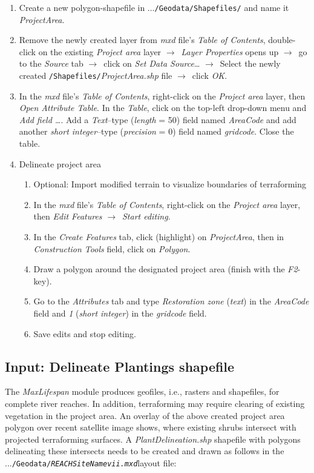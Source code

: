 \begin{enumerate}
\def\labelenumi{\arabic{enumi})}
\item Create a new polygon-shapefile in $\ldots{}$\texttt{/Geodata/Shapefiles/} and name it \emph{ProjectArea}.
\item Remove the newly created layer from \emph{mxd} file's \emph{Table of Contents}, double-click on the existing \emph{Project area} layer $\rightarrow$~\emph{Layer Properties} opens up $\rightarrow$~go to the \emph{Source} tab $\rightarrow$~click on \emph{Set Data Source}\ldots{} $\rightarrow$~Select the newly created \texttt{/Shapefiles/}\emph{ProjectArea.shp} file $\rightarrow$~click \emph{OK}.
\item In the \emph{mxd} file's \emph{Table of Contents}, right-click on the \emph{Project area} layer, then \emph{Open Attribute Table}. In the \emph{Table}, click on the top-left drop-down menu and \emph{Add field \ldots{}}. Add a \emph{Text}--type (\emph{length} = 50) field named \emph{AreaCode} and add another \emph{short integer}--type (\emph{precision} = 0) field named \emph{gridcode}. Close the table.
\item  Delineate project area
  \begin{enumerate}
  \def\labelenumii{\alph{enumii}.}
  \item Optional: Import modified terrain to visualize boundaries of terraforming
  \item In the \emph{mxd} file's \emph{Table of Contents}, right-click on the \emph{Project area} layer, then \emph{Edit Features} $\rightarrow$~\emph{Start editing}.
  \item In the \emph{Create Features} tab, click (highlight) on \emph{ProjectArea}, then in \emph{Construction Tools} field, click on \emph{Polygon}.
  \item Draw a polygon around the designated project area (finish with the \emph{F2}-key).
  \item Go to the \emph{Attributes} tab and type \emph{Restoration zone} (\emph{text}) in the \emph{AreaCode} field and \emph{1} (\emph{short integer}) in the \emph{gridcode} field.
  \item Save edits and stop editing.
  \end{enumerate}
\end{enumerate}

\subsection{Input: Delineate Plantings shapefile}\label{sec:pminp3}
The \emph{MaxLifespan} module produces geofiles, i.e., rasters and shapefiles, for complete river reaches. In addition, terraforming may require clearing of existing vegetation in the project area. An overlay of the above created project area polygon over recent satellite image shows, where existing shrubs intersect with projected terraforming surfaces. A \emph{PlantDelineation.shp} shapefile with polygons delineating these intersects needs to be created and drawn as follows in the ...\texttt{/Geodata/\emph{REACH{\myUnderscore}SiteName{\myUnderscore}vii.mxd}}layout file:


